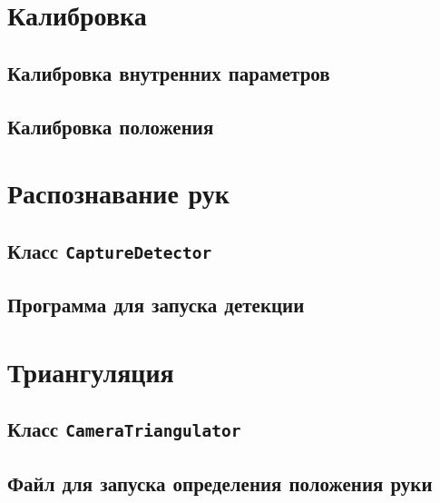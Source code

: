\documentclass[12pt, a4paper]{article}
\begin{document}
\section{Калибровка}
\subsection{Калибровка внутренних параметров}



\subsection{Калибровка положения}
 

\section{Распознавание рук}
\subsection{Класс \texttt{CaptureDetector}}

\subsection{Программа для запуска детекции}


\section{Триангуляция}
\subsection{Класс \texttt{CameraTriangulator}}


\subsection{Файл для запуска определения положения руки}

\end{document}
